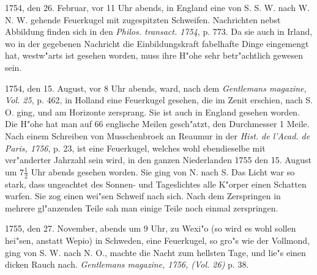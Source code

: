 \documentclass[a4paper, 11pt, oneside, polutonikogreek, german]{article}
\begin{document}
1754, den 26. Februar, vor 11 Uhr abends, in England eine von S. S. W. nach W. N. W. gehende Feuerkugel mit zugespitzten Schweifen. Nachrichten nebst Abbildung finden sich in den \emph{Philos. transact. 1754}, p. 773. Da sie auch in Irland, wo in der gegebenen Nachricht die Einbildungskraft fabelhafte Dinge eingemengt hat, westw"arts ist gesehen worden, muss ihre H"ohe sehr betr"achtlich gewesen sein.

1754, den 15. August, vor 8 Uhr abends, ward, nach dem \emph{Gentlemans magazine, Vol. 25}, p. 462, in Holland eine Feuerkugel gesehen, die im Zenit erschien, nach S. O. ging, und am Horizonte zersprang. Sie ist auch in England gesehen worden. Die H"ohe hat man auf 66 englische Meilen gesch"atzt, den Durchmesser 1 Meile. Nach einem Schreiben von Musschenbroek an Reaumur in der \emph{Hist. de l'Acad. de Paris, 1756}, p. 23, ist eine Feuerkugel, welches wohl ebendieselbe mit ver"anderter Jahrzahl sein wird, in den ganzen Niederlanden 1755 den 15. August um $\mathfrak{7\frac{1}{2}}$ Uhr abends gesehen worden. Sie ging von N. nach S. Das Licht war so stark, dass ungeachtet des Sonnen- und Tageslichtes alle K"orper einen Schatten warfen. Sie zog einen wei"sen Schweif nach sich. Nach dem Zerspringen in mehrere gl"anzenden Teile sah man einige Teile noch einmal zerspringen.

1755, den 27. November, abends um 9 Uhr, zu Wexi"o (so wird es wohl sollen hei"sen, anstatt Wepio) in Schweden, eine Feuerkugel, so gro"s wie der Vollmond, ging von S. W. nach N. O., machte die Nacht zum hellsten Tage, und lie"s einen dicken Rauch nach. \emph{Gentlemans magazine, 1756, (Vol. 26)} p. 38.
\end{document}
